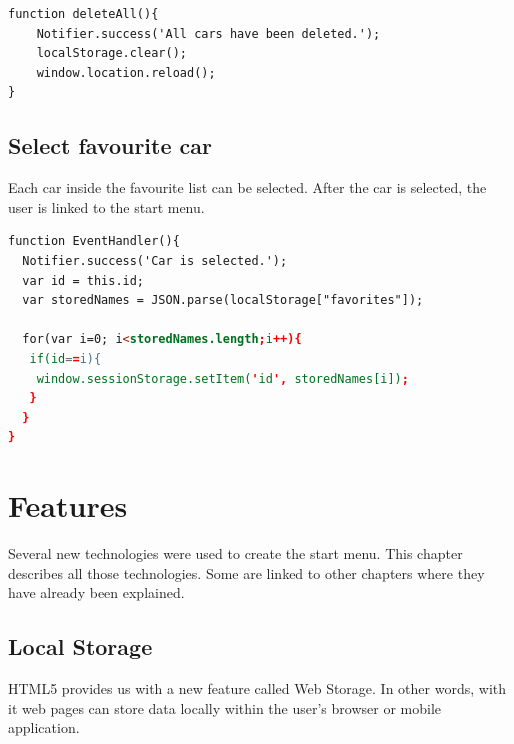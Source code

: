 \begin{lstlisting}[language=html, caption= 
Delete all function,captionpos=b]
function deleteAll(){
    Notifier.success('All cars have been deleted.');
	localStorage.clear();
    window.location.reload();
}
\end{lstlisting}

\subsection{Select favourite car}
Each car inside the favourite list can be selected. After the car is selected, the user is linked to the start menu.
\\

\begin{lstlisting}[language=html, caption=
Select car function,captionpos=b] 
function EventHandler(){
  Notifier.success('Car is selected.');
  var id = this.id;
  var storedNames = JSON.parse(localStorage["favorites"]);
	
  for(var i=0; i<storedNames.length;i++){
   if(id==i){
    window.sessionStorage.setItem('id', storedNames[i]);
   }
  }
}
\end{lstlisting}






















\section{Features}
Several new technologies were used to create the start menu. This chapter describes all those technologies. Some are linked to other chapters where they have already been explained. 
\\


\subsection{Local Storage}

HTML5 provides us with a new feature called Web Storage. In other words, with it web pages can store data locally within the user's browser or mobile application.
\\

